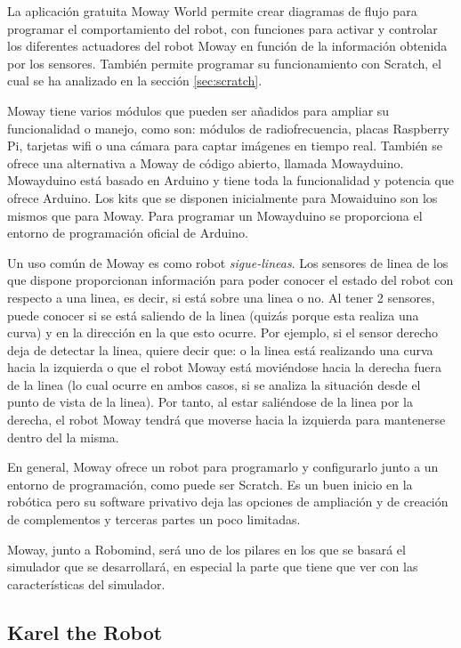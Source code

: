 La aplicación gratuita Moway World permite crear diagramas de flujo para programar el comportamiento del robot, con funciones para activar y controlar los diferentes actuadores del robot Moway en función de la información obtenida por los sensores. También permite programar su funcionamiento con Scratch, el cual se ha analizado en la sección \ref{sec:scratch}. 

Moway tiene varios módulos que pueden ser añadidos para ampliar su funcionalidad o manejo, como son: módulos de radiofrecuencia, placas Raspberry Pi, tarjetas wifi o una cámara para captar imágenes en tiempo real. También se ofrece una alternativa a Moway de código abierto, llamada Mowayduino. Mowayduino está basado en Arduino y tiene toda la funcionalidad y potencia que ofrece Arduino. Los kits que se disponen inicialmente para Mowaiduino son los mismos que para Moway. Para programar un Mowayduino se proporciona el entorno de programación oficial de Arduino.


Un uso común de Moway es como robot \emph{sigue-lineas}. Los sensores de linea de los que dispone proporcionan información para poder conocer el estado del robot con respecto a una linea, es decir, si está sobre una linea o no. Al tener 2 sensores, puede conocer si se está saliendo de la linea (quizás porque esta realiza una curva) y en la dirección en la que esto ocurre. Por ejemplo, si el sensor derecho deja de detectar la linea, quiere decir que: o la linea está realizando una curva hacia la izquierda o que el robot Moway está moviéndose hacia la derecha fuera de la linea (lo cual ocurre en ambos casos, si se analiza la situación desde el punto de vista de la linea). Por tanto, al estar saliéndose de la linea por la derecha, el robot Moway tendrá que moverse hacia la izquierda para mantenerse dentro del la misma. 


En general, Moway ofrece un robot para programarlo y configurarlo junto a un entorno de programación, como puede ser Scratch. Es un buen inicio en la robótica pero su software privativo deja las opciones de ampliación y de creación de complementos y terceras partes un poco limitadas.

Moway, junto a Robomind, será uno de los pilares en los que se basará el simulador que se desarrollará, en especial la parte que tiene que ver con las características del simulador.



\subsection{Karel the Robot}
\label{sec:karel-the-robot}


